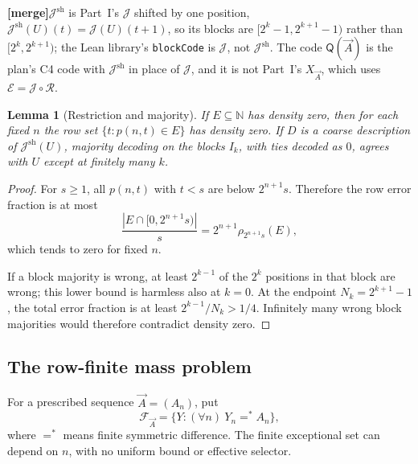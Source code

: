 \documentclass[11pt,letterpaper]{article}
\theoremstyle{plain}
\newtheorem{lemma}[theorem]{Lemma}
\theoremstyle{definition}
\theoremstyle{remark}
\numberwithin{equation}{section}
\newcommand{\N}{\mathbb N}
\newcommand{\Rcode}{\mathcal R}
\newcommand{\Ecode}{\mathcal E}
\newcommand{\Jcode}{\mathcal J}
\newcommand{\mergenote}[1]{\par\smallskip\noindent
 {\small\textsf{\textbf{[merge]}}\enspace #1}\par\smallskip}
\newcommand{\Jsh}{\mathcal J^{\mathrm{sh}}} %
\newcommand{\QQ}{\mathsf Q}              %
\newcommand{\FF}{\mathcal F}             %
\begin{document}
\mergenote{$\Jsh$ is Part~I's $\Jcode$ shifted by one position,
$\Jsh(U)(t)=\Jcode(U)(t+1)$, so its blocks are $[2^k-1,2^{k+1}-1)$ rather than
$[2^k,2^{k+1})$; the Lean library's \texttt{blockCode} is $\Jcode$, not $\Jsh$. The
code $\QQ(\vec A)$ is the plan's C4 code with $\Jsh$ in place of $\Jcode$, and it is
not Part~I's $X_{\vec A}$, which uses $\Ecode=\Jcode\circ\Rcode$.}

\begin{lemma}[Restriction and majority]\label{cr12:ep:lem:majority}
If $E\subseteq\N$ has density zero, then for each fixed $n$ the row set
$\{t:p(n,t)\in E\}$ has density zero. If $D$ is a coarse description of $\Jsh(U)$,
majority decoding on the blocks $I_k$, with ties decoded as $0$, agrees with $U$
except at finitely many $k$.
\end{lemma}
\begin{proof}
For $s\ge1$, all $p(n,t)$ with $t<s$ are below $2^{n+1}s$. Therefore the row error
fraction is at most
\[
 \frac{|E\cap[0,2^{n+1}s)|}{s}
   =2^{n+1}\rho_{2^{n+1}s}(E),
\]
which tends to zero for fixed $n$.

If a block majority is wrong, at least $2^{k-1}$ of the $2^k$ positions in that
block are wrong; this lower bound is harmless also at $k=0$. At the endpoint
$N_k=2^{k+1}-1$, the total error fraction is at least $2^{k-1}/N_k>1/4$. Infinitely
many wrong block majorities would therefore contradict density zero.
\end{proof}

\subsection{The row-finite mass problem}
For a prescribed sequence $\vec A=(A_n)$, put
\begin{equation}\label{cr12:ep:eq:F}
 \FF_{\vec A}=\{Y:(\forall n)\ Y_n=^*A_n\},
\end{equation}
where $=^*$ means finite symmetric difference. The finite exceptional set can depend
on $n$, with no uniform bound or effective selector.
\end{document}
